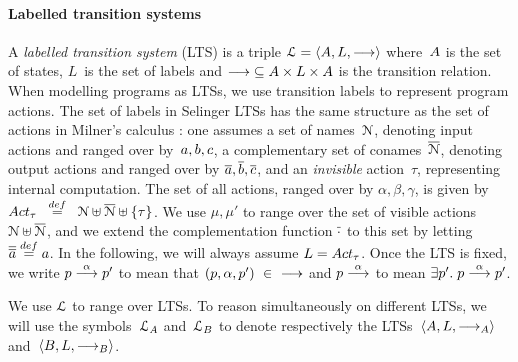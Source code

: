 
\paragraph{Labelled transition systems}
A \emph{labelled transition system} (LTS) is a triple
$\mathcal{L} = \langle  A ,  L ,  \mathrel{\overset{}\longrightarrow}  \rangle$ where~$A$ is the set
of states, $L$~is the set of labels
  and ${\mathrel{\overset{}\longrightarrow}}
  \subseteq A \times L \times A$ is the transition
  relation.
  When modelling programs as LTSs, we use transition labels to
  represent program actions. The set of labels in Selinger LTSs has
  the same structure as the set of actions in Milner's calculus \CCS:
  one assumes a set of names~$\mathcal{N}$, denoting input actions and
  ranged over by~$a, b, c$, a complementary set of
  conames~$\overline{\mathcal{N}}$, denoting output actions and ranged over
  by $\overline{a}, \overline{b}, \overline{c}$, and an \emph{invisible}
  action~$\tau$, representing internal computation.
The set of all actions, ranged over by $\alpha, \beta, \gamma$,
is given by
$\Acttau \;\;\eqdef\;\; \Names \uplus \overline{\Names}
   \uplus \{ \tau \} $.
We use $\mu, \mu'$ to range over the set of visible actions $\mathcal{N}
\uplus \overline{\mathcal{N}}$, and we extend the complementation function
$\overline{\cdot}$ to this set by letting ${\co{\co \aa}} \eqdef \aa$.
In the following, we will always assume $L = \Acttau$.
Once the LTS is fixed, we write %
$p \mathrel{\overset{\alpha}\longrightarrow} p'$ to mean that
$(p,\alpha,p')~\in~{\mathrel{\overset{}\longrightarrow}}$ and $ p \mathrel{\overset{ \alpha }\longrightarrow}$
to mean $\exists p' . \; p \mathrel{\overset{\alpha}\longrightarrow} p'$.
%

We use $\mathcal{L}$ to range over LTSs. To reason
simultaneously on different LTSs, we will use the
symbols~$\mathcal{L}_A$ and~$\mathcal{L}_B$ to denote respectively
the LTSs~$\langle A, L, \mathrel{\overset{}\longrightarrow}_A \rangle$ and~$\langle B, L, \mathrel{\overset{}\longrightarrow}_B \rangle$.


